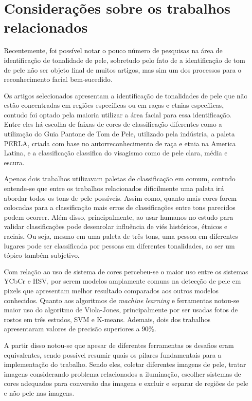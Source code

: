 \section{Considerações sobre os trabalhos relacionados}
Recentemente, foi possível notar o pouco número de pesquisas na área de identificação de tonalidade de pele, sobretudo pelo fato de a identificação de tom de pele não ser objeto final de muitos artigos, mas sim um dos processos para o reconhecimento facial bem-sucedido. 

Os artigos selecionados apresentam a identificação de tonalidades de pele que não estão concentradas em regiões específicas ou em raças e etnias específicas, contudo foi optado pela maioria utilizar a área facial para essa identificação. Entre eles há escolha de faixas de cores de classificação diferentes como a utilização do Guia Pantone de Tom de Pele, utilizado pela indústria, a paleta PERLA, criada com base no autorreconhecimento de raça e etnia na America Latina, e a classificação classifica do visagismo como de pele clara, média e escura.

Apenas dois trabalhos utilizavam paletas de classificação em comum, contudo entende-se que entre os trabalhos relacionados dificilmente uma paleta irá abordar todos os tons de pele possíveis. Assim como, quanto mais cores forem colocadas para a classificação mais erros de classificações entre tons parecidos podem ocorrer. Além disso, principalmente, ao usar humanos no estudo para validar classificações pode desenrolar influência de viés históricos, étnicos e raciais. Ou seja, mesmo em uma paleta de três tons, uma pessoa em diferentes lugares pode ser classificada por pessoas em diferentes tonalidades, ao ser um tópico também subjetivo.

Com relação ao uso de sistema de cores percebeu-se o maior uso entre os sistemas YCbCr e HSV, por serem modelos amplamente comuns na detecção de pele em pixels que apresentam melhor resultado comparados aos outros modelos conhecidos. Quanto aos algoritmos de \textit{machine learning} e ferramentas notou-se maior uso do algoritmo de Viola-Jones, principalmente por ser usadas fotos de rostos em três estudos, SVM e K-means. Ademais, dois dos trabalhos apresentaram valores de precisão superiores a 90\%.

A partir disso notou-se que apesar de diferentes ferramentas os desafios eram equivalentes, sendo possível resumir quais os pilares fundamentais para a implementação do trabalho. Sendo eles, coletar diferentes imagens de pele, tratar imagens considerando problema relacionados a iluminação, escolher sistemas de cores adequados para conversão das imagens e excluir e separar de regiões de pele e não pele nas imagens.



